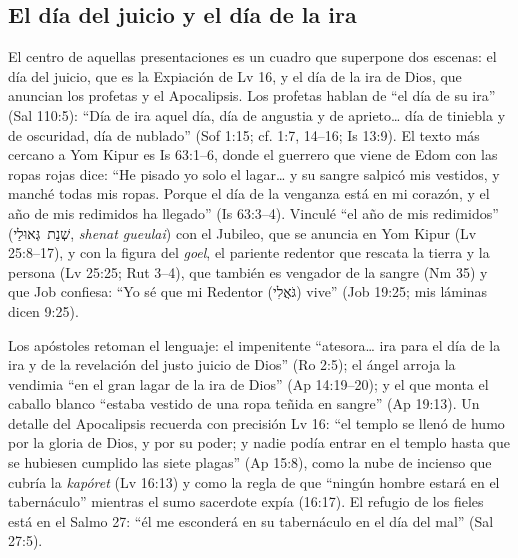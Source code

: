 \documentclass[11pt,letterpaper]{article}
\newcommand{\heb}[1]{\mbox{\foreignlanguage{hebrew}{#1}}}
\begin{document}
\subsection{El día del juicio y el día de la ira}
El centro de aquellas presentaciones es un cuadro que superpone dos escenas: el día del juicio, que es la Expiación de Lv 16, y el día de la ira de Dios, que anuncian los profetas y el Apocalipsis. Los profetas hablan de ``el día de su ira'' (Sal 110:5): ``Día de ira aquel día, día de angustia y de aprieto\ldots{} día de tiniebla y de oscuridad, día de nublado'' (Sof 1:15; cf. 1:7, 14--16; Is 13:9). El texto más cercano a Yom Kipur es Is 63:1--6, donde el guerrero que viene de Edom con las ropas rojas dice: ``He pisado yo solo el lagar\ldots{} y su sangre salpicó mis vestidos, y manché todas mis ropas. Porque el día de la venganza está en mi corazón, y el año de mis redimidos ha llegado'' (Is 63:3--4). Vinculé ``el año de mis redimidos'' (\heb{שְׁנַת גְּאוּלַי}, \emph{shenat gueulai}) con el Jubileo, que se anuncia en Yom Kipur (Lv 25:8--17), y con la figura del \emph{goel}, el pariente redentor que rescata la tierra y la persona (Lv 25:25; Rut 3--4), que también es vengador de la sangre (Nm 35) y que Job confiesa: ``Yo sé que mi Redentor (\heb{גֹּאֲלִי}) vive'' (Job 19:25; mis láminas dicen 9:25).

Los apóstoles retoman el lenguaje: el impenitente ``atesora\ldots{} ira para el día de la ira y de la revelación del justo juicio de Dios'' (Ro 2:5); el ángel arroja la vendimia ``en el gran lagar de la ira de Dios'' (Ap 14:19--20); y el que monta el caballo blanco ``estaba vestido de una ropa teñida en sangre'' (Ap 19:13). Un detalle del Apocalipsis recuerda con precisión Lv 16: ``el templo se llenó de humo por la gloria de Dios, y por su poder; y nadie podía entrar en el templo hasta que se hubiesen cumplido las siete plagas'' (Ap 15:8), como la nube de incienso que cubría la \emph{kapóret} (Lv 16:13) y como la regla de que ``ningún hombre estará en el tabernáculo'' mientras el sumo sacerdote expía (16:17). El refugio de los fieles está en el Salmo 27: ``él me esconderá en su tabernáculo en el día del mal'' (Sal 27:5).
\end{document}
